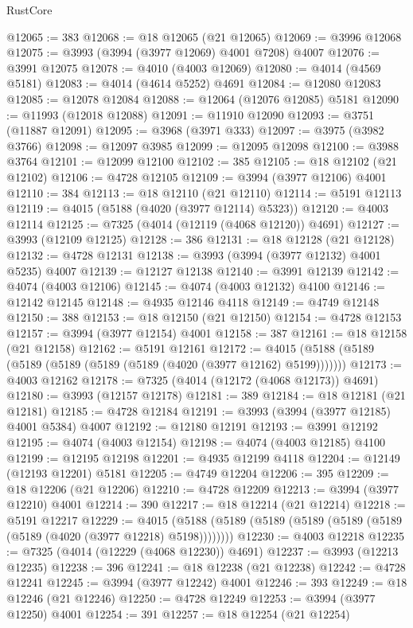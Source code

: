 \begin{lexlean}{RustCore}
\begin{coremodule}
@12065 := 383
@12068 := @18 @12065 (@21 @12065)
@12069 := @3996 @12068
@12075 := @3993 (@3994 (@3977 @12069) @4001 @7208) @4007
@12076 := @3991 @12075
@12078 := @4010 (@4003 @12069)
@12080 := @4014 (@4569 @5181)
@12083 := @4014 (@4614 @5252) @4691
@12084 := @12080 @12083
@12085 := @12078 @12084
@12088 := @12064 (@12076 @12085) @5181
@12090 := @11993 (@12018 @12088)
@12091 := @11910 @12090
@12093 := @3751 (@11887 @12091)
@12095 := @3968 (@3971 @333)
@12097 := @3975 (@3982 @3766)
@12098 := @12097 @3985
@12099 := @12095 @12098
@12100 := @3988 @3764
@12101 := @12099 @12100
@12102 := 385
@12105 := @18 @12102 (@21 @12102)
@12106 := @4728 @12105
@12109 := @3994 (@3977 @12106) @4001
@12110 := 384
@12113 := @18 @12110 (@21 @12110)
@12114 := @5191 @12113
@12119 := @4015 (@5188 (@4020 (@3977 @12114) @5323))
@12120 := @4003 @12114
@12125 := @7325 (@4014 (@12119 (@4068 @12120)) @4691)
@12127 := @3993 (@12109 @12125)
@12128 := 386
@12131 := @18 @12128 (@21 @12128)
@12132 := @4728 @12131
@12138 := @3993 (@3994 (@3977 @12132) @4001 @5235) @4007
@12139 := @12127 @12138
@12140 := @3991 @12139
@12142 := @4074 (@4003 @12106)
@12145 := @4074 (@4003 @12132) @4100
@12146 := @12142 @12145
@12148 := @4935 @12146 @4118
@12149 := @4749 @12148
@12150 := 388
@12153 := @18 @12150 (@21 @12150)
@12154 := @4728 @12153
@12157 := @3994 (@3977 @12154) @4001
@12158 := 387
@12161 := @18 @12158 (@21 @12158)
@12162 := @5191 @12161
@12172 := @4015 (@5188 (@5189 (@5189 (@5189 (@5189 (@5189 (@4020 (@3977 @12162) @5199)))))))
@12173 := @4003 @12162
@12178 := @7325 (@4014 (@12172 (@4068 @12173)) @4691)
@12180 := @3993 (@12157 @12178)
@12181 := 389
@12184 := @18 @12181 (@21 @12181)
@12185 := @4728 @12184
@12191 := @3993 (@3994 (@3977 @12185) @4001 @5384) @4007
@12192 := @12180 @12191
@12193 := @3991 @12192
@12195 := @4074 (@4003 @12154)
@12198 := @4074 (@4003 @12185) @4100
@12199 := @12195 @12198
@12201 := @4935 @12199 @4118
@12204 := @12149 (@12193 @12201) @5181
@12205 := @4749 @12204
@12206 := 395
@12209 := @18 @12206 (@21 @12206)
@12210 := @4728 @12209
@12213 := @3994 (@3977 @12210) @4001
@12214 := 390
@12217 := @18 @12214 (@21 @12214)
@12218 := @5191 @12217
@12229 := @4015 (@5188 (@5189 (@5189 (@5189 (@5189 (@5189 (@5189 (@4020 (@3977 @12218) @5198))))))))
@12230 := @4003 @12218
@12235 := @7325 (@4014 (@12229 (@4068 @12230)) @4691)
@12237 := @3993 (@12213 @12235)
@12238 := 396
@12241 := @18 @12238 (@21 @12238)
@12242 := @4728 @12241
@12245 := @3994 (@3977 @12242) @4001
@12246 := 393
@12249 := @18 @12246 (@21 @12246)
@12250 := @4728 @12249
@12253 := @3994 (@3977 @12250) @4001
@12254 := 391
@12257 := @18 @12254 (@21 @12254)

\end{coremodule}
\end{lexlean}
